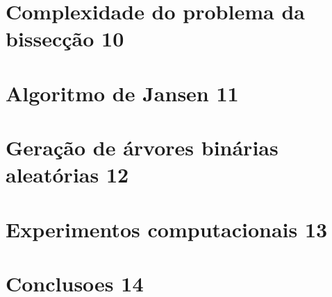 \documentclass[a4paper,12pt]{article}
\begin{document}
\section {Complexidade do problema da bissecção 10}



\section {Algoritmo de Jansen 11}



\section {Geração de árvores binárias aleatórias 12}



\section {Experimentos computacionais 13}



\section {Conclusoes 14}



\newpage


\end{document}
